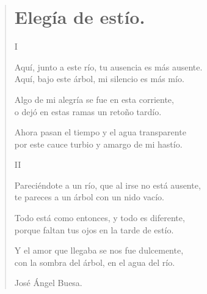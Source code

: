 \documentclass[11pt, portrait, twoside, notitlepage, openright]{book}
\begin{document}
\newpage
\begin{verse}
\begin{center}
\section{Elegía de estío.}
\end{center}
\begin{center}
I
\end{center}

Aquí, junto a este río, tu ausencia es más ausente.\\
Aquí, bajo este árbol, mi silencio es más mío.
\newline

Algo de mi alegría se fue en esta corriente,\\
o dejó en estas ramas un retoño tardío.
\newline

Ahora pasan el tiempo y el agua transparente\\
por este cauce turbio y amargo de mi hastío.
\newline

\begin{center}
II
\end{center}

Pareciéndote a un río, que al irse no está ausente,\\
te pareces a un árbol con un nido vacío.
\newline

Todo está como entonces, y todo es diferente,\\
porque faltan tus ojos en la tarde de estío.
\newline

Y el amor que llegaba se nos fue dulcemente,\\
con la sombra del árbol, en el agua del río.
\newline

José Ángel Buesa.
\end{verse}
\end{document}
